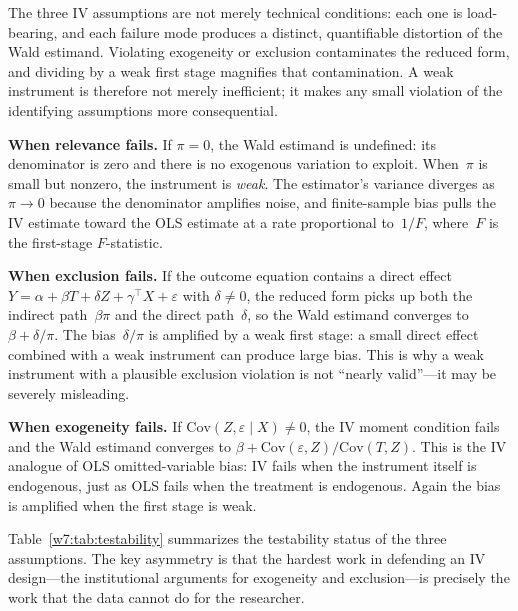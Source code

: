 \documentclass[master.tex]{subfiles}
\begin{document}
The three IV assumptions are not merely technical conditions: each
one is load-bearing, and each failure mode produces a distinct,
quantifiable distortion of the Wald estimand.  Violating exogeneity
or exclusion contaminates the reduced form, and dividing by a weak
first stage magnifies that contamination.  A weak instrument is
therefore not merely inefficient; it makes any small violation of
the identifying assumptions more consequential.

\medskip\noindent\textbf{When relevance fails.}
If $\pi = 0$, the Wald estimand is undefined: its denominator is
zero and there is no exogenous variation to exploit.  When~$\pi$ is
small but nonzero, the instrument is \emph{weak}.  The estimator's
variance diverges as $\pi \to 0$ because the denominator amplifies
noise, and finite-sample bias pulls the IV estimate toward the OLS
estimate at a rate proportional to~$1/F$, where~$F$ is the
first-stage $F$-statistic.

\medskip\noindent\textbf{When exclusion fails.}
If the outcome equation contains a direct effect
$Y = \alpha + \beta T + \delta Z + \gamma^\top X + \varepsilon$
with $\delta \neq 0$, the reduced form picks up both the
indirect path~$\beta\pi$ and the direct path~$\delta$, so the
Wald estimand converges to $\beta + \delta/\pi$.  The
bias~$\delta/\pi$ is amplified by a weak first stage: a small
direct effect combined with a weak instrument can produce large
bias.  This is why a weak instrument with a plausible exclusion
violation is not ``nearly valid''---it may be severely misleading.

\medskip\noindent\textbf{When exogeneity fails.}
If $\mathrm{Cov}(Z, \varepsilon \mid X) \neq 0$, the IV moment
condition fails and the Wald estimand converges to
$\beta + \mathrm{Cov}(\varepsilon, Z)/\mathrm{Cov}(T, Z)$.
This is the IV analogue of OLS omitted-variable bias: IV fails
when the instrument itself is endogenous, just as OLS fails when
the treatment is endogenous.  Again the bias is amplified when
the first stage is weak.

\medskip
Table~\ref{w7:tab:testability} summarizes the testability status
of the three assumptions.  The key asymmetry is that the hardest
work in defending an IV design---the institutional arguments for
exogeneity and exclusion---is precisely the work that the data
cannot do for the researcher.
\end{document}
